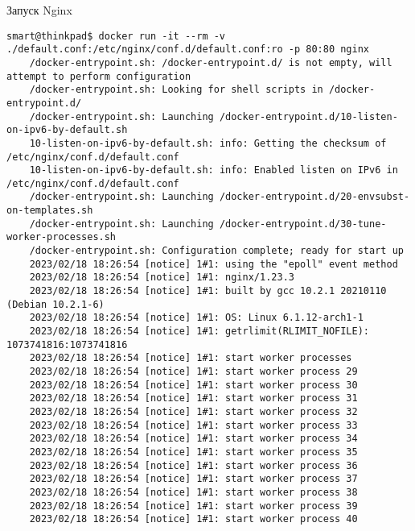 Запуск Nginx
\begin{lstlisting}[style=CommandLineStyle]
    smart@thinkpad$ docker run -it --rm -v ./default.conf:/etc/nginx/conf.d/default.conf:ro -p 80:80 nginx
    /docker-entrypoint.sh: /docker-entrypoint.d/ is not empty, will attempt to perform configuration
    /docker-entrypoint.sh: Looking for shell scripts in /docker-entrypoint.d/
    /docker-entrypoint.sh: Launching /docker-entrypoint.d/10-listen-on-ipv6-by-default.sh
    10-listen-on-ipv6-by-default.sh: info: Getting the checksum of /etc/nginx/conf.d/default.conf
    10-listen-on-ipv6-by-default.sh: info: Enabled listen on IPv6 in /etc/nginx/conf.d/default.conf
    /docker-entrypoint.sh: Launching /docker-entrypoint.d/20-envsubst-on-templates.sh
    /docker-entrypoint.sh: Launching /docker-entrypoint.d/30-tune-worker-processes.sh
    /docker-entrypoint.sh: Configuration complete; ready for start up
    2023/02/18 18:26:54 [notice] 1#1: using the "epoll" event method
    2023/02/18 18:26:54 [notice] 1#1: nginx/1.23.3
    2023/02/18 18:26:54 [notice] 1#1: built by gcc 10.2.1 20210110 (Debian 10.2.1-6) 
    2023/02/18 18:26:54 [notice] 1#1: OS: Linux 6.1.12-arch1-1
    2023/02/18 18:26:54 [notice] 1#1: getrlimit(RLIMIT_NOFILE): 1073741816:1073741816
    2023/02/18 18:26:54 [notice] 1#1: start worker processes
    2023/02/18 18:26:54 [notice] 1#1: start worker process 29
    2023/02/18 18:26:54 [notice] 1#1: start worker process 30
    2023/02/18 18:26:54 [notice] 1#1: start worker process 31
    2023/02/18 18:26:54 [notice] 1#1: start worker process 32
    2023/02/18 18:26:54 [notice] 1#1: start worker process 33
    2023/02/18 18:26:54 [notice] 1#1: start worker process 34
    2023/02/18 18:26:54 [notice] 1#1: start worker process 35
    2023/02/18 18:26:54 [notice] 1#1: start worker process 36
    2023/02/18 18:26:54 [notice] 1#1: start worker process 37
    2023/02/18 18:26:54 [notice] 1#1: start worker process 38
    2023/02/18 18:26:54 [notice] 1#1: start worker process 39
    2023/02/18 18:26:54 [notice] 1#1: start worker process 40
\end{lstlisting}

